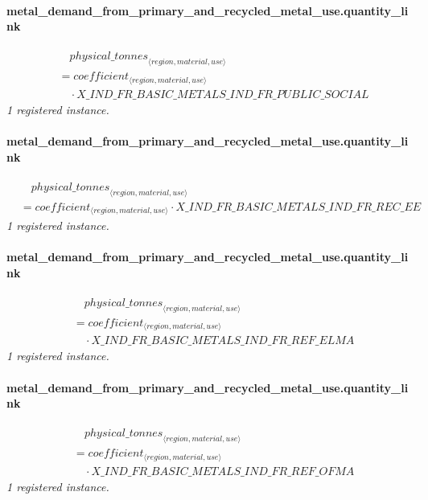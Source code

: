 \documentclass[11pt]{article}
\begin{document}
\paragraph{metal\_demand\_from\_primary\_and\_recycled\_metal\_use.quantity\_link}
\begin{align*}
&\quad {physical\_tonnes}_{\langle region, material, use\rangle}\\
&= coefficient_{\langle region, material, use\rangle}\\
&\quad {}\cdot X\_IND\_FR\_BASIC\_METALS\_IND\_FR\_PUBLIC\_SOCIAL
\end{align*}
\noindent\emph{1 registered instance.}\par
\paragraph{metal\_demand\_from\_primary\_and\_recycled\_metal\_use.quantity\_link}
\begin{align*}
&\quad {physical\_tonnes}_{\langle region, material, use\rangle}\\
&= coefficient_{\langle region, material, use\rangle} \cdot X\_IND\_FR\_BASIC\_METALS\_IND\_FR\_REC\_EE
\end{align*}
\noindent\emph{1 registered instance.}\par
\paragraph{metal\_demand\_from\_primary\_and\_recycled\_metal\_use.quantity\_link}
\begin{align*}
&\quad {physical\_tonnes}_{\langle region, material, use\rangle}\\
&= coefficient_{\langle region, material, use\rangle}\\
&\quad {}\cdot X\_IND\_FR\_BASIC\_METALS\_IND\_FR\_REF\_ELMA
\end{align*}
\noindent\emph{1 registered instance.}\par
\paragraph{metal\_demand\_from\_primary\_and\_recycled\_metal\_use.quantity\_link}
\begin{align*}
&\quad {physical\_tonnes}_{\langle region, material, use\rangle}\\
&= coefficient_{\langle region, material, use\rangle}\\
&\quad {}\cdot X\_IND\_FR\_BASIC\_METALS\_IND\_FR\_REF\_OFMA
\end{align*}
\noindent\emph{1 registered instance.}\par
\end{document}
